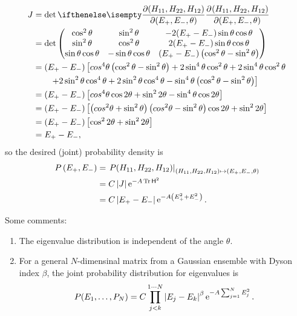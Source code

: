 \documentclass[a4paper,11pt,twoside]{article}
\begin{document}
            \begin{align}
                J&=\det\partialderivative{\left(H_{11},H_{22},H_{12}\right)}{\left(E_{+},E_{-},\theta\right)}\nonumber\\
                    &=\det\makematrix{\cos^{2}\theta & \sin^{2}\theta & -2(E_{+}-E_{-})\sin\theta\cos\theta \\
                        \sin^{2}\theta & \cos^{2}\theta & 2(E_{+}-E_{-})\sin\theta\cos\theta \\
                        \sin\theta\cos\theta & -\sin\theta\cos\theta & (E_{+}-E_{-})\left(\cos^{2}\theta-\sin^{2}\theta\right)}\nonumber\\
                    &=\left(E_{+}-E_{-}\right)\left[cos^{4}\theta\left(\cos^{2}\theta-\sin^{2}\theta\right)+2\sin^{4}\theta\cos^{2}\theta+2\sin^{4}\theta\cos^{2}\theta\right.\nonumber\\
                    &\qquad\left.+2\sin^{2}\theta\cos^{4}\theta+2\sin^{2}\theta\cos^{4}\theta-\sin^{4}\theta\left(\cos^{2}\theta-\sin^{2}\theta\right)\right]\nonumber\\
                    &=\left(E_{+}-E_{-}\right)\left[cos^{4}\theta\cos2\theta+\sin^{2}2\theta-\sin^{4}\theta\cos2\theta\right]\nonumber\\
                    &=\left(E_{+}-E_{-}\right)\left[\left(cos^{2}\theta+\sin^{2}\theta\right)\left(cos^{2}\theta-\sin^{2}\theta\right)\cos2\theta+\sin^{2}2\theta\right]\nonumber\\
                    &=\left(E_{+}-E_{-}\right)\left[\cos^{2}2\theta+\sin^{2}2\theta\right]\nonumber\\
                    &=E_{+}-E_{-},
            \end{align}
            so the desired (joint) probability density is
            \begin{align}
                P\left(E_{+},E_{-}\right)
                    &=\left. P(H_{11},H_{22},H_{12})\right|
                        _{\left(H_{11},H_{22},H_{12}\right)\mapsto{\left(E_{+},E_{-},\theta\right)}}\nonumber\\
                    &=C\left|{J}\right|\operatorname{e}^{-A\operatorname{Tr}{\mathsf{H}^{2}}}\nonumber\\
                    \label{eq:PE2}
                    &=C\left|{E_{+}-E_{-}}\right|\operatorname{e}^{-A\left(E_{+}^{2}+E_{-}^{2}\right)}.
            \end{align}

            Some comments:
            \begin{enumerate}
                \item The eigenvalue distribution is independent of the angle $\theta$.
                \item For a general $N$-dimensinal matrix from a Gaussian ensemble with Dyson index $\beta$, the joint probability distribution for eigenvalues is
                    \begin{equation}
                        \label{eq:PE}
                        P(E_{1},\dotsc,P_{N})=C\prod_{j<k}^{1\dotsb N}\left|{E_{j}-E_{k}}\right|^{\beta}\operatorname{e}^{-A\sum_{j=1}^{N}E_{j}^{2}}.
                    \end{equation}
            \end{enumerate}
\end{document}
